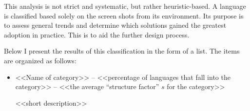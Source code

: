 This analysis is not strict and systematic, but rather heuristic-based. A language is classified based solely on the screen shots from its environment. Its purpose is to assess general trends and determine which solutions gained the greatest adoption in practice. This is to aid the further design process. 

Below I present the results of this classification in the form of a list. The items are organized as follows:

\begin{itemize}
    \item <<Name of category>> -- <<percentage of languages that fall into the
category>> -- <<the average ``structure factor'' $s$ for the category>>

    <<short description>>
\end{itemize}

